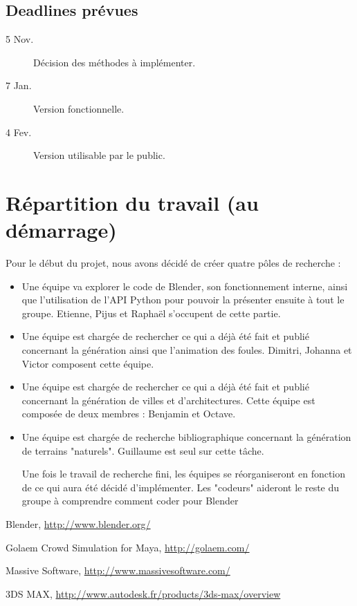 \documentclass[a4paper,12pt]{article}
\begin{document}
\subsection*{Deadlines prévues}
\begin{description}
  \item[5 Nov.] Décision des méthodes à implémenter. 
  \item[7 Jan.] Version fonctionnelle.
  \item[4 Fev.] Version utilisable par le public.
\end{description}


\section{Répartition du travail (au démarrage)}

Pour le début du projet, nous avons décidé de créer quatre pôles de recherche :
\begin{itemize}
\item Une équipe va explorer le code de Blender, son fonctionnement interne, ainsi que l'utilisation de l'API Python pour pouvoir la présenter ensuite à tout le groupe. Etienne, Pijus et Raphaël s'occupent de cette partie. 
\item Une équipe est chargée de rechercher ce qui a déjà été fait et publié concernant la génération ainsi que l'animation des foules. Dimitri, Johanna et Victor composent cette équipe.
\item Une équipe est chargée de rechercher ce qui a déjà été fait et publié concernant la génération de villes et d'architectures. Cette équipe est composée de deux membres : Benjamin et Octave.
\item Une équipe est chargée de recherche bibliographique concernant la génération de terrains "naturels". Guillaume est seul sur cette tâche.

Une fois le travail de recherche fini, les équipes se réorganiseront en fonction de ce qui aura été décidé d'implémenter. Les "codeurs" aideront le reste du groupe à comprendre comment coder pour Blender
\end{itemize}

\newpage

\begin{thebibliography}{}

  Blender,
  \url{http://www.blender.org/}


  Golaem Crowd Simulation for Maya,
  \url{http://golaem.com/}


  Massive Software,
  \url{http://www.massivesoftware.com/}


  3DS MAX,
  \url{http://www.autodesk.fr/products/3ds-max/overview}

\end{thebibliography}
\end{document}
